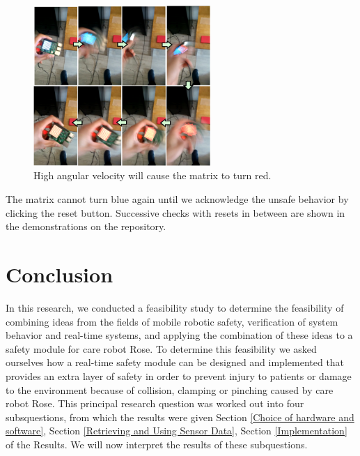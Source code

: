 \documentclass[12pt]{scrreprt}
\begin{document}
\begin{figure}[H]
    \centering
    \includegraphics[width=0.6\textwidth]{Figures/results/lighting_leds/angular_velocity.png}
    \caption{High angular velocity will cause the matrix to turn red.}
    \label{fig:high_angular_velocity}
\end{figure}

The matrix cannot turn blue again until we acknowledge the unsafe behavior by clicking the reset button. Successive checks with resets in between are shown in the demonstrations on the repository.

\newpage
\chapter{Conclusion}
\label{Conclusion}

In this research, we conducted a feasibility study to determine the feasibility of combining ideas from the fields of mobile robotic safety, verification of system behavior and real-time systems, and applying the combination of these ideas to a safety module for care robot Rose. To determine this feasibility we asked ourselves how a real-time safety module can be designed and implemented that provides an extra layer of safety in order to prevent injury to patients or damage to the environment because of collision, clamping or pinching caused by care robot Rose. This principal research question was worked out into four subsquestions, from which the results were given Section \ref{Choice of hardware and software}, Section \ref{Retrieving and Using Sensor Data}, Section \ref{Implementation} of the Results. We will now interpret the results of these subquestions.
\end{document}
